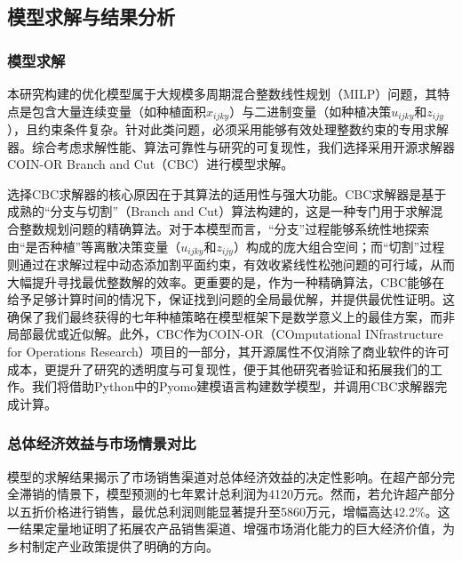 \subsection{模型求解与结果分析}

\subsubsection{模型求解}

本研究构建的优化模型属于大规模多周期混合整数线性规划（MILP）问题，其特点是包含大量连续变量（如种植面积$x_{ijky}$）与二进制变量（如种植决策$u_{ijky}$和$z_{ijy}$），且约束条件复杂。针对此类问题，必须采用能够有效处理整数约束的专用求解器。综合考虑求解性能、算法可靠性与研究的可复现性，我们选择采用开源求解器COIN-OR Branch and Cut（CBC）进行模型求解。

选择CBC求解器的核心原因在于其算法的适用性与强大功能。CBC求解器是基于成熟的“分支与切割”（Branch and Cut）算法构建的，这是一种专门用于求解混合整数规划问题的精确算法。对于本模型而言，“分支”过程能够系统性地探索由“是否种植”等离散决策变量（$u_{ijky}$和$z_{ijy}$）构成的庞大组合空间；而“切割”过程则通过在求解过程中动态添加割平面约束，有效收紧线性松弛问题的可行域，从而大幅提升寻找最优整数解的效率。更重要的是，作为一种精确算法，CBC能够在给予足够计算时间的情况下，保证找到问题的全局最优解，并提供最优性证明。这确保了我们最终获得的七年种植策略在模型框架下是数学意义上的最佳方案，而非局部最优或近似解。此外，CBC作为COIN-OR（COmputational INfrastructure for Operations Research）项目的一部分，其开源属性不仅消除了商业软件的许可成本，更提升了研究的透明度与可复现性，便于其他研究者验证和拓展我们的工作。我们将借助Python中的Pyomo建模语言构建数学模型，并调用CBC求解器完成计算。

\subsubsection{总体经济效益与市场情景对比}


模型的求解结果揭示了市场销售渠道对总体经济效益的决定性影响。在超产部分完全滞销的情景下，模型预测的七年累计总利润为4120万元。然而，若允许超产部分以五折价格进行销售，最优总利润则能显著提升至5860万元，增幅高达42.2\%。这一结果定量地证明了拓展农产品销售渠道、增强市场消化能力的巨大经济价值，为乡村制定产业政策提供了明确的方向。

